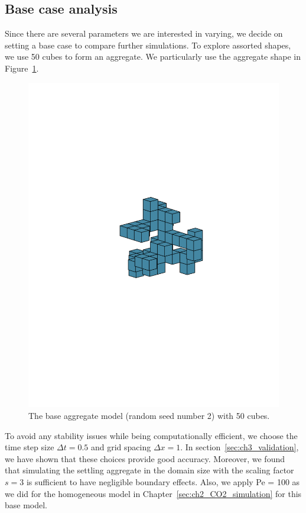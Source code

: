 \subsection{Base case analysis}
Since there are several parameters we are interested in varying, we decide on setting a base case to compare further simulations. To explore assorted shapes, we use 50 cubes to form an aggregate. We particularly use the aggregate shape in Figure~\ref{fig_NC50_base_seed2}. 
\begin{figure}[ht]
	\begin{center}
		\vspace*{3mm}
		\includegraphics[scale=0.5]{./figures/fig_NC50_seed2}
	\caption{The base aggregate model (random seed number 2) with 50 cubes.}
	\label{fig_NC50_base_seed2}
\end{center}
\end{figure}
To avoid any stability issues while being computationally efficient, we choose the time step size $\Delta t = 0.5$ and grid spacing $\Delta x =1$. In section~\ref{sec:ch3_validation}, we have shown that these choices provide good accuracy. Moreover, we found that simulating the settling aggregate in the domain size with the scaling factor $s = 3$ is sufficient to have negligible boundary effects.  Also, we apply Pe = 100 as we did for the homogeneous model in Chapter~\ref{sec:ch2_CO2_simulation} for this base model.

